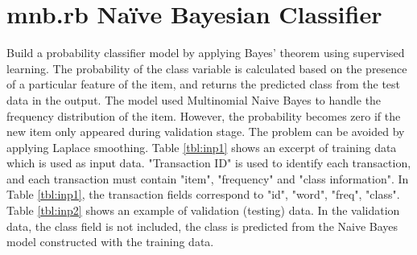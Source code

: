 


\section{mnb.rb Na{\"i}ve Bayesian Classifier\label{sect:nb}}

Build a probability classifier model by applying Bayes' theorem using supervised learning.
The probability of the class variable is calculated based on the presence of a particular feature of the item, and returns the predicted class from the test data in the output.
The model used Multinomial Naive Bayes to handle the frequency distribution of the item.
However, the probability becomes zero if the new item only appeared during validation stage. The problem can be avoided by applying Laplace smoothing. 
Table \ref{tbl:inp1} shows an excerpt of training data which is used as input data.
"Transaction ID" is used to identify each transaction, and each transaction must contain  "item", "frequency" and  "class information". 
 In Table \ref{tbl:inp1}, the transaction fields correspond to "id", "word", "freq", "class". 
 Table \ref{tbl:inp2} shows an example of validation (testing) data. In the validation data, the class field is not included, the class is predicted from the Naive Bayes model constructed with the training data. 
 

